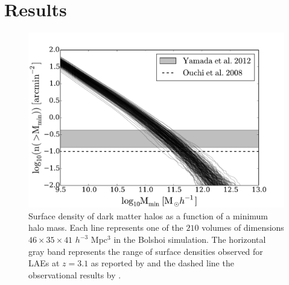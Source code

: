\documentclass{emulateapj}
\begin{document}
\section{Results}
\label{sec:results}



\begin{figure}
\begin{center}
\includegraphics[width=0.95\linewidth,angle=0]{Fig1.pdf}
\caption{ \label{fig:halos} Surface density of dark 
  matter halos as a function of a minimum halo mass. Each line
  represents one of the $210$ volumes of dimensions $46\times 35\times
  41$ $h^{-3}$ Mpc$^{3}$ in the Bolshoi simulation. The horizontal
  gray band represents the range of surface densities observed for
  LAEs at $z=3.1$ as reported by \citet{Yamada2012} and the dashed
  line the observational results by \citet{Ouchi2008}.}
\end{center} 
\end{figure}
\end{document}
